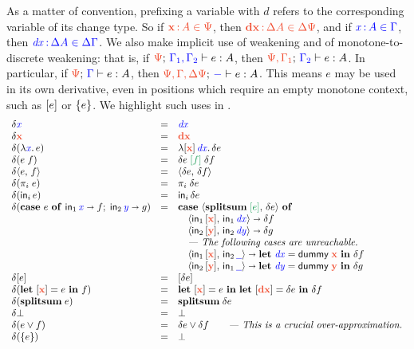 \documentclass{article}
\newcommand{\dummy}{\ms{dummy}}
\newcommand{\preserve}[1]{{\color{ForestGreen}{#1}}}
\newcommand{\preservedisc}[1]{\preserve{\disc{#1}}}
\newcommand{\comment}[1]{\textit{--- {#1}}}
\begin{document}
As a matter of convention, prefixing a variable with $d$ refers to the corresponding variable of its change type.
%
So if $\dt{\d{x} \of A \in \GP}$, then $\dt{\d{dx} \of \Ch A \in \Ch \GP}$, and if ${\color{blue}{\ensuremath{{\color{blue}{\mathit{x}}}} \,{:}\,A \in \Gamma}}$, then ${\color{blue}{\ensuremath{{\color{blue}{\mathit{dx}}}} \,{:}\,\Delta A \in \Delta\Gamma}}$.
%
We also make implicit use of weakening and of monotone-to-discrete weakening: that is, if $\J{\GP}{\GG_1,\GG_2}{e}{A}$, then $\J{\GP,\GG_1}{\GG_2}{e}{A}$.
%
In particular, if $\J{\GP}{\GG}{e}{A}$, then $\J{\GP,\GG,\Ch\GP}{-}{e}{A}$.
%
This means $e$ may be used in its own derivative, even in positions which require an empty monotone context, such as $[{e}]$ or $\{{e}\}$.
%
We highlight such uses in \preserve{green}.
%
\[
\begin{array}{lcll}
  \delta \m{x} &=& \m{dx}\\
  \delta \d{x} &=& \d{dx}\\
  \delta(\lam{\m{x}} e) &=&
  \lam{\disc{\d{x}} \, \m{dx}} \delta e\\
  \delta(e\;f) &=& \delta e \; \preservedisc{f} \; \delta f\\
  \delta \pair{e}{f} &=& \pair{\delta{e}}{\delta{f}}\\
  \delta(\pi_i\; e) &=& \pi_i\; \delta{e}\\
  \delta(\inj{i}{e}) &=& \inj{i}{\delta{e}}\\

  \delta(\case{e}{\m x}{f}{\m y}{g})
  &=& \mb{case}~ \pair{\splitsum{\preservedisc{e}}}{\delta e} ~\mb{of}\\
   && \quad \pair{\inj{1}{\disc{\d{x}}}}{\inj{1}{\m{dx}}} \cto \delta f\\
   && \quad \pair{\inj{2}{\disc{\d{y}}}}{\inj{2}{\m{dy}}} \cto \delta g\\
   && \quad \comment{The following cases are unreachable.}\\
   && \quad \pair{\inj{1}{\disc{\d{x}}}}{\inj{2}{\m{\pwild}}} \cto
      \letv{\m{dx}}{\dummy\; \d{x}} \delta f\\
   && \quad \pair{\inj{2}{\disc{\d{y}}}}{\inj{1}{\m{\pwild}}} \cto
      \letv{\m{dy}}{\dummy\; \d{y}} \delta g\\

  \delta\disc{e} &=& \disc{\delta e}\\
  \delta(\letdisc{\d{x}}{e} f) &=&
    \letdisc{\d{x}}{e} \letdisc{\d{dx}}{\delta e} \delta f\\

  \delta(\splitsum{e}) &=&
  \splitsum{\delta e}\\
  \delta \unit &=& \unit\\
  \delta(e \vee f) &=& \delta e \vee \delta f
  \qquad \comment{This is a crucial over-approximation.}\\
  \delta(\single{e}) &=& \unit\\


\end{array}\]
\end{document}
